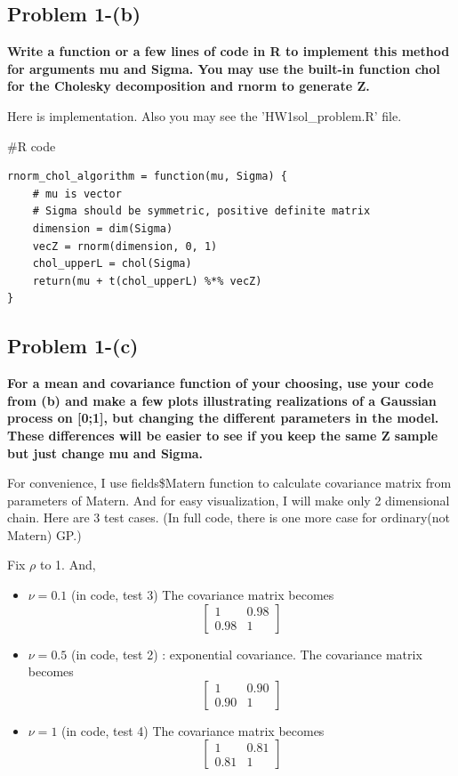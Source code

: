 \documentclass{article}
\newenvironment{Rcode}%
{%
    \begin{mdframed}
    \#R code
    \begin{small}
}
{%
    \end{small}
    \end{mdframed}
}
\begin{document}
\subsection{Problem 1-(b)}
\textbf{
Write a function or a few lines of code in R to implement this method
for arguments mu and Sigma. You may use the built-in function chol for the Cholesky decomposition and rnorm to generate Z.
}

Here is implementation. 
Also you may see the 'HW1sol\_problem.R' file.

\begin{Rcode}
    \begin{verbatim}
rnorm_chol_algorithm = function(mu, Sigma) {
    # mu is vector
    # Sigma should be symmetric, positive definite matrix
    dimension = dim(Sigma)
    vecZ = rnorm(dimension, 0, 1)
    chol_upperL = chol(Sigma)
    return(mu + t(chol_upperL) %*% vecZ)    
}
    \end{verbatim}
\end{Rcode}



\subsection{Problem 1-(c)}
\textbf{
For a mean and covariance function of your choosing, use your code from (b) and
make a few plots illustrating realizations of a Gaussian process on [0;1], but changing the different parameters in the model.
These differences will be easier to see if you keep the same Z sample but just change mu and Sigma.
}

For convenience, I use fields\$Matern function to calculate covariance matrix from parameters of Matern.
And for easy visualization, I will make only 2 dimensional chain.
Here are 3 test cases. (In full code, there is one more case for ordinary(not Matern) GP.)

Fix $\rho$ to 1. And,
\begin{itemize}
    \item $\nu = 0.1$ (in code, test 3)
    The covariance matrix becomes
    \[\begin{bmatrix}
        1 & 0.98 \\ 0.98 & 1
    \end{bmatrix}
    \]
    \item $\nu = 0.5$ (in code, test 2) : exponential covariance. 
    The covariance matrix becomes
    \[\begin{bmatrix}
        1 & 0.90 \\ 0.90 & 1
    \end{bmatrix}
    \]
    \item $\nu = 1$ (in code, test 4)
    The covariance matrix becomes
    \[\begin{bmatrix}
        1 & 0.81 \\ 0.81 & 1
    \end{bmatrix}
    \]
\end{itemize}
\end{document}
